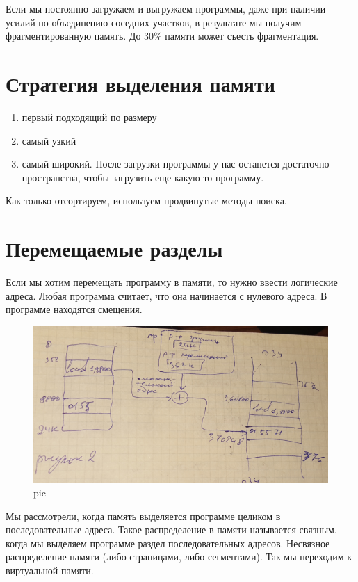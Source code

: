 Если мы постоянно загружаем и выгружаем программы, даже при наличии усилий по объединению соседних участков, в результате мы получим фрагментированную память. До 30\% памяти может съесть фрагментация.

\section{Стратегия выделения памяти}
\begin{enumerate}
    \item первый подходящий по размеру
    \item самый узкий 
    \item самый широкий. После загрузки программы у нас останется достаточно пространства, чтобы загрузить еще какую-то программу.
\end{enumerate} 

Как только отсортируем, используем продвинутые методы поиска.

\section{Перемещаемые разделы}

Если мы хотим перемещать программу в памяти, то нужно ввести логические адреса. Любая программа считает, что она начинается с нулевого адреса. В программе находятся смещения.

\begin{figure}[H]
    \centering
    \includegraphics[width=\textwidth]{pic/2.png}
    \caption{pic}
\end{figure}

Мы рассмотрели, когда память выделяется программе целиком в последовательные адреса. Такое распределение в памяти называется связным, когда мы выделяем программе раздел последовательных адресов. Несвязное распределение памяти (либо страницами, либо сегментами). Так мы переходим к виртуальной памяти.

